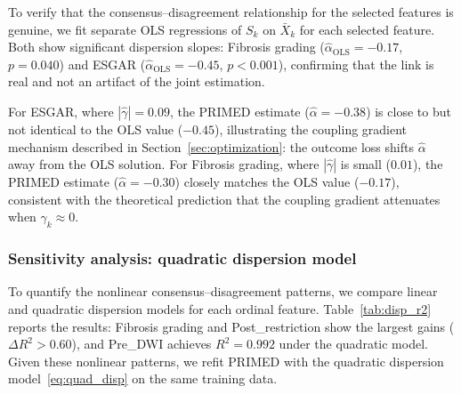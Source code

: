 \documentclass[referee,lineno,pdflatex,sn-vancouver-num]{sn-jnl}
\begin{document}
To verify that the consensus--disagreement relationship for the selected features is genuine, we fit separate OLS regressions of $S_k$ on $\bar X_k$ for each selected feature.
Both show significant dispersion slopes: Fibrosis grading ($\hat\alpha_{\mathrm{OLS}} = -0.17$, $p = 0.040$) and ESGAR ($\hat\alpha_{\mathrm{OLS}} = -0.45$, $p < 0.001$), confirming that the link is real and not an artifact of the joint estimation.

For ESGAR, where $|\hat\gamma| = 0.09$, the PRIMED estimate ($\hat\alpha = -0.38$) is close to but not identical to the OLS value ($-0.45$), illustrating the coupling gradient mechanism described in Section~\ref{sec:optimization}: the outcome loss shifts $\hat\alpha$ away from the OLS solution.
For Fibrosis grading, where $|\hat\gamma|$ is small ($0.01$), the PRIMED estimate ($\hat\alpha = -0.30$) closely matches the OLS value ($-0.17$), consistent with the theoretical prediction that the coupling gradient attenuates when $\gamma_k \approx 0$.

\subsubsection{Sensitivity analysis: quadratic dispersion model}\label{sec:quad_sensitivity}

To quantify the nonlinear consensus--disagreement patterns, we compare linear and quadratic dispersion models for each ordinal feature.
Table~\ref{tab:disp_r2} reports the results: Fibrosis grading and Post\_restriction show the largest gains ($\Delta R^2 > 0.60$), and Pre\_DWI achieves $R^2 = 0.992$ under the quadratic model.
Given these nonlinear patterns, we refit PRIMED with the quadratic dispersion model~\eqref{eq:quad_disp} on the same training data.
\end{document}
